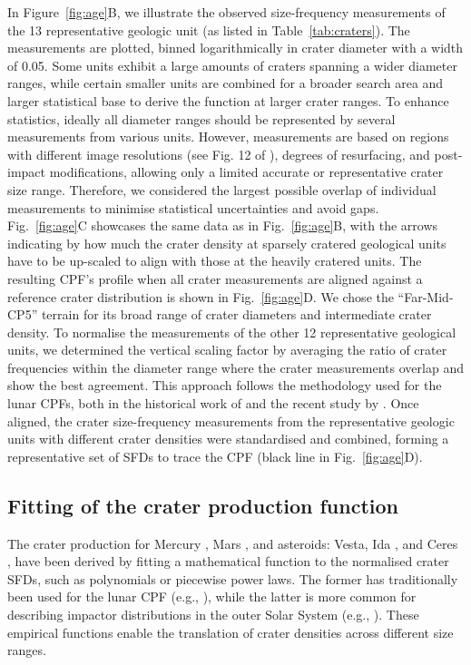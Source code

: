 \documentclass[preprint,11pt,3p,times,authoryear]{elsarticle}
\begin{document}
In Figure~\ref{fig:age}B, we illustrate the observed size-frequency measurements of the 13 representative geologic unit (as listed in Table~\ref{tab:craters}). The measurements are plotted, binned logarithmically in crater diameter with a width of 0.05.
Some units exhibit a large amounts of craters spanning a wider diameter ranges, while certain smaller units are combined for a broader search area and larger statistical base to derive the function at larger crater ranges. To enhance statistics, ideally all diameter ranges should be represented by several measurements from various units. However, measurements are based on regions with different image resolutions (see Fig. 12 of \citealt{Bland2018}), degrees of resurfacing, and post-impact modifications, allowing only a limited accurate or representative crater size range. Therefore, we considered the largest possible overlap of individual measurements to minimise statistical uncertainties and avoid gaps.\\

Fig.~\ref{fig:age}C showcases the same data as in Fig.~\ref{fig:age}B, with the arrows indicating by how much the crater density at sparsely cratered geological units have to be up-scaled to align with those at the heavily cratered units.
The resulting CPF's profile when all crater measurements are aligned against a reference crater distribution is shown in Fig.~\ref{fig:age}D. We chose the ``Far-Mid-CP5'' terrain for its broad range of crater diameters and intermediate crater density. To normalise the measurements of the other 12 representative geological units, we determined the vertical scaling factor by averaging the ratio of crater frequencies within the diameter range where the crater measurements overlap and show the best agreement.
This approach follows the methodology used for the lunar CPFs, both in the historical work of \citet{Neukum1975} and the recent study by \citet{Xiao2024}. Once aligned, the crater size-frequency measurements from the representative geologic units with different crater densities were standardised and combined, forming a representative set of SFDs to trace the CPF (black line in Fig.~\ref{fig:age}D).\\

\subsection{Fitting of the crater production function}
\label{subsec:fitting}
The crater production for Mercury \citep{Neukum2001}, Mars \citep{Ivanov2001, Hartmann2005}, and asteroids: Vesta, Ida \citep{Schmedemann2014}, and Ceres \citep{Hiesinger2016}, have been derived by fitting a mathematical function to the normalised crater SFDs, such as polynomials or piecewise power laws. The former has traditionally been used for the lunar CPF (e.g., \citealt{Neukum2001}), while the latter is more common for describing impactor distributions in the outer Solar System (e.g., \citealt{Zahnle2003}). These empirical functions enable the translation of crater densities across different size ranges. \\
\end{document}
